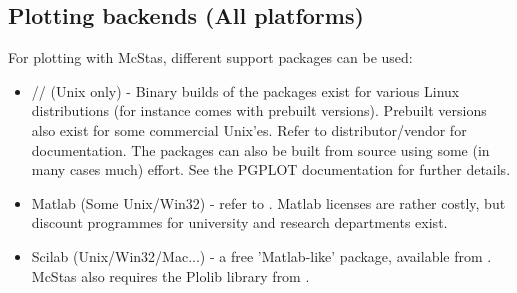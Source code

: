 \subsection{Plotting backends (All platforms)}
\label{s:plotting}
For plotting with McStas, different support packages can be used:
\begin{itemize}
\item{// (Unix only) - Binary builds of the packages
    exist for various Linux distributions (for instance
     comes with
    prebuilt versions). Prebuilt versions also exist for some commercial Unix'es. 
    Refer to distributor/vendor for documentation. The packages can also be
    built from source using some (in many cases much) effort.  See the
    PGPLOT documentation for further details.}
\item{Matlab (Some Unix/Win32) - refer to
    . Matlab licenses are rather costly, but discount programmes for university and research departments exist.}
\item{Scilab (Unix/Win32/Mac...) - a free 'Matlab-like' package, available from
    . McStas also requires the Plolib library from .}
\end{itemize}
